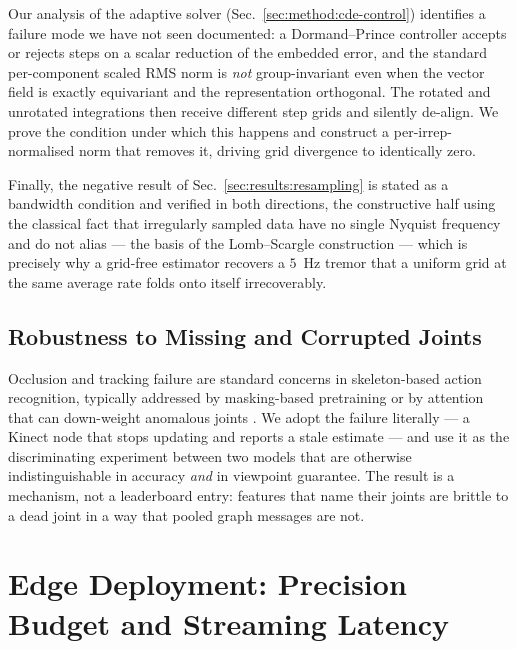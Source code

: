 \documentclass[10pt,journal]{IEEEtran}
\begin{document}
Our analysis of the adaptive solver (Sec.~\ref{sec:method:cde-control}) identifies a failure mode we have not seen documented: a Dormand--Prince controller \cite{dormand1980prince} accepts or rejects steps on a scalar reduction of the embedded error, and the standard per-component scaled RMS norm is \emph{not} group-invariant even when the vector field is exactly equivariant and the representation orthogonal. The rotated and unrotated integrations then receive different step grids and silently de-align. We prove the condition under which this happens and construct a per-irrep-normalised norm that removes it, driving grid divergence to identically zero.

Finally, the negative result of Sec.~\ref{sec:results:resampling} is stated as a bandwidth condition and verified in both directions, the constructive half using the classical fact that irregularly sampled data have no single Nyquist frequency and do not alias --- the basis of the Lomb--Scargle construction \cite{vanderplas2018lombscargle} --- which is precisely why a grid-free estimator recovers a $5$~Hz tremor that a uniform grid at the same average rate folds onto itself irrecoverably.

\subsection{Robustness to Missing and Corrupted Joints}
Occlusion and tracking failure are standard concerns in skeleton-based action recognition, typically addressed by masking-based pretraining or by attention that can down-weight anomalous joints \cite{yan2018stgcn}. We adopt the failure literally --- a Kinect node that stops updating and reports a stale estimate --- and use it as the discriminating experiment between two models that are otherwise indistinguishable in accuracy \emph{and} in viewpoint guarantee. The result is a mechanism, not a leaderboard entry: features that name their joints are brittle to a dead joint in a way that pooled graph messages are not.





\section{Edge Deployment: Precision Budget and Streaming Latency}
\label{sec:deploy}
\end{document}
